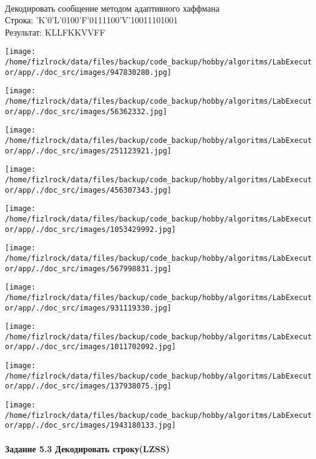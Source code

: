 \documentclass[a4paper, 12pt]{article}
\begin{document}
\\ 

Декодировать сообщение методом адаптивного хаффмана \\
Строка: 
'K'0'L'0100'F'0111100'V'10011101001\\
Результат: KLLFKKVVFF

\texttt{[image: /home/fizlrock/data/files/backup/code\_backup/hobby/algoritms/LabExecutor/app/./doc\_src/images/947830280.jpg]}

\texttt{[image: /home/fizlrock/data/files/backup/code\_backup/hobby/algoritms/LabExecutor/app/./doc\_src/images/56362332.jpg]}

\texttt{[image: /home/fizlrock/data/files/backup/code\_backup/hobby/algoritms/LabExecutor/app/./doc\_src/images/251123921.jpg]}

\texttt{[image: /home/fizlrock/data/files/backup/code\_backup/hobby/algoritms/LabExecutor/app/./doc\_src/images/456307343.jpg]}

\texttt{[image: /home/fizlrock/data/files/backup/code\_backup/hobby/algoritms/LabExecutor/app/./doc\_src/images/1053429992.jpg]}

\texttt{[image: /home/fizlrock/data/files/backup/code\_backup/hobby/algoritms/LabExecutor/app/./doc\_src/images/567998831.jpg]}

\texttt{[image: /home/fizlrock/data/files/backup/code\_backup/hobby/algoritms/LabExecutor/app/./doc\_src/images/931119330.jpg]}

\texttt{[image: /home/fizlrock/data/files/backup/code\_backup/hobby/algoritms/LabExecutor/app/./doc\_src/images/1011702092.jpg]}

\texttt{[image: /home/fizlrock/data/files/backup/code\_backup/hobby/algoritms/LabExecutor/app/./doc\_src/images/137938075.jpg]}

\texttt{[image: /home/fizlrock/data/files/backup/code\_backup/hobby/algoritms/LabExecutor/app/./doc\_src/images/1943180133.jpg]}
\pagebreak
\paragraph{Задание 5.3 Декодировать строку(LZSS)\\}
\end{document}
